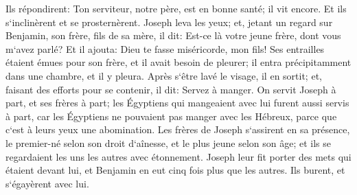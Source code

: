 \verse Ils répondirent: Ton serviteur, notre père, est en bonne santé; il vit encore. Et ils s`inclinèrent et se prosternèrent. 
\verse Joseph leva les yeux; et, jetant un regard sur Benjamin, son frère, fils de sa mère, il dit: Est-ce là votre jeune frère, dont vous m`avez parlé? Et il ajouta: Dieu te fasse miséricorde, mon fils! 
\verse Ses entrailles étaient émues pour son frère, et il avait besoin de pleurer; il entra précipitamment dans une chambre, et il y pleura. 
\verse Après s`être lavé le visage, il en sortit; et, faisant des efforts pour se contenir, il dit: Servez à manger. 
\verse On servit Joseph à part, et ses frères à part; les Égyptiens qui mangeaient avec lui furent aussi servis à part, car les Égyptiens ne pouvaient pas manger avec les Hébreux, parce que c`est à leurs yeux une abomination. 
\verse Les frères de Joseph s`assirent en sa présence, le premier-né selon son droit d`aînesse, et le plus jeune selon son âge; et ils se regardaient les uns les autres avec étonnement. 
\verse Joseph leur fit porter des mets qui étaient devant lui, et Benjamin en eut cinq fois plus que les autres. Ils burent, et s`égayèrent avec lui. 

